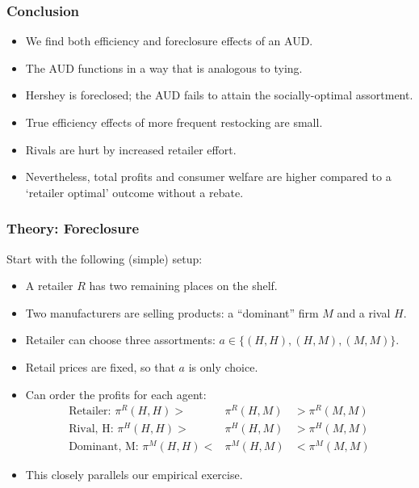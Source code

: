 \documentclass[aspectratio=169]{beamer}
\begin{document}
\begin{frame}
\frametitle{Conclusion}
\begin{itemize}
\item We find both efficiency and foreclosure effects of an AUD.
\item The AUD functions in a way that is analogous to tying.
\item Hershey is foreclosed; the AUD fails to attain the socially-optimal assortment.
\item True efficiency effects of more frequent restocking are small.
\item Rivals are hurt by increased retailer effort.
\item Nevertheless, total profits and consumer welfare are higher compared to a `retailer optimal' outcome without a rebate.
\end{itemize}
\end{frame}


\begin{frame}[label=supplemental]
\frametitle{Theory: Foreclosure}
Start with the following (simple) setup:
\begin{itemize}
\item A retailer $R$ has two remaining places on the shelf.
\item Two manufacturers are selling products: a ``dominant'' firm $M$ and a rival $H$.
\item Retailer can choose three assortments: $a \in \{ (H,H), (H,M), (M,M)\}$.
\item Retail prices are fixed, so that $a$ is only choice.
\item Can order the profits for each agent:
\begin{eqnarray*}
\label{profitorder}
\nonumber \text{Retailer:  } \pi^R(H,H) >& \pi^R(H,M) &> \pi^R(M,M)\\
\nonumber \text{Rival, H:  }\pi^H(H,H) >& \pi^H(H,M) &> \pi^H(M,M)\\
\text{Dominant, M:  }\pi^M(H,H) <& \pi^M(H,M) &<  \pi^M(M,M)
\end{eqnarray*}
\item This closely parallels our empirical exercise.
\end{itemize}
\end{frame}
\end{document}
